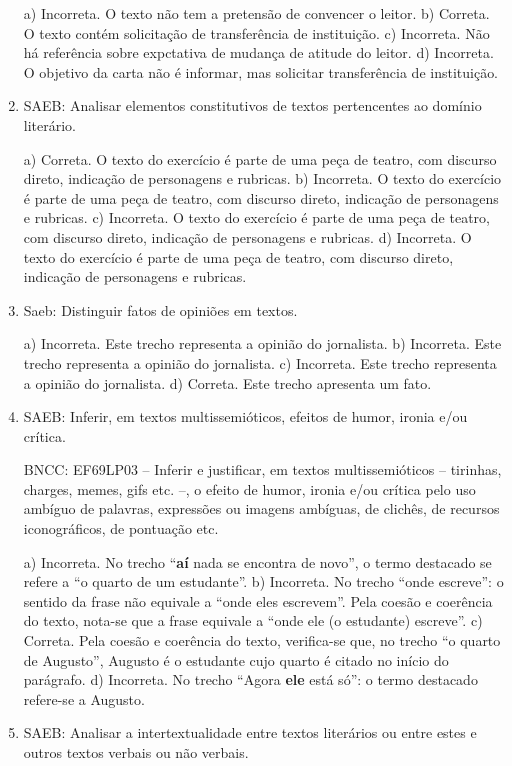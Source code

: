\begin{enumerate}
a) Incorreta. O texto não tem a pretensão de convencer o leitor.
b) Correta. O texto contém solicitação de transferência de instituição.
c) Incorreta. Não há referência sobre expctativa de mudança de atitude do leitor. 
d) Incorreta. O objetivo da carta não é informar, mas solicitar transferência de instituição.

\item
SAEB: Analisar elementos constitutivos de textos pertencentes ao domínio literário.

a) Correta. O texto do exercício é parte de uma peça de teatro, com discurso direto, indicação
de personagens e rubricas.
b) Incorreta. O texto do exercício é parte de uma peça de teatro, com discurso direto, indicação
de personagens e rubricas.
c) Incorreta. O texto do exercício é parte de uma peça de teatro, com discurso direto, indicação
de personagens e rubricas.
d) Incorreta. O texto do exercício é parte de uma peça de teatro, com discurso direto, indicação
de personagens e rubricas.

\item
Saeb: Distinguir fatos de opiniões em textos.
 
a) Incorreta. Este trecho representa a opinião do jornalista.
b) Incorreta. Este trecho representa a opinião do jornalista.
c) Incorreta. Este trecho representa a opinião do jornalista.
d) Correta. Este trecho apresenta um fato.

\item
SAEB: Inferir, em textos multissemióticos, efeitos de humor, ironia e/ou
crítica.

BNCC: EF69LP03 -- Inferir e justificar, em textos multissemióticos --
tirinhas, charges, memes, gifs etc. --, o efeito de humor, ironia e/ou
crítica pelo uso ambíguo de palavras, expressões ou imagens ambíguas, de
clichês, de recursos iconográficos, de pontuação etc.

a) Incorreta. No trecho ``\textbf{aí} nada se encontra de novo'', o termo destacado se refere a 
``o quarto de um estudante''.
b) Incorreta. No trecho ``onde escreve'': o sentido da frase não equivale a ``onde eles escrevem''.
Pela coesão e coerência do texto, nota-se que a frase equivale a ``onde ele (o estudante) escreve''.
c) Correta. Pela coesão e coerência do texto, verifica-se que, no trecho ``o quarto de Augusto'', 
Augusto é o estudante cujo quarto é citado no início do parágrafo.  
d) Incorreta. No trecho ``Agora \textbf{ele} está só'': o termo destacado refere-se a Augusto.

\item
SAEB: Analisar a intertextualidade entre textos literários ou entre
estes e outros textos verbais ou não verbais.


\end{enumerate}
